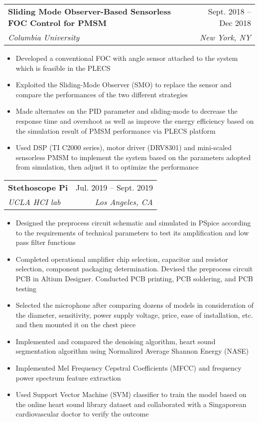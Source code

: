 \documentclass[letterpaper,11pt]{article}
\makeatletter
\newcommand{\resumeItem}[1]{
  \item\small{
    {#1 \vspace{-2pt}}
  }
}
\newcommand{\resumeSubheading}[4]{
  \vspace{-2pt}\item
    \begin{tabular*}{0.97\textwidth}[t]{l@{\extracolsep{\fill}}r}
      \textbf{#1} & #2 \\
      \textit{\small#3} & \textit{\small #4} \\
    \end{tabular*}\vspace{-7pt}
}
\newcommand{\resumeItemListStart}{\begin{itemize}}
\newcommand{\resumeItemListEnd}{\end{itemize}\vspace{-5pt}}
\makeatother
\begin{document}
    \resumeSubheading
      {Sliding Mode Observer-Based Sensorless FOC Control for PMSM}{Sept. 2018 -- Dec 2018}
      {Columbia University}{New York, NY}
      \resumeItemListStart
        \resumeItem{Developed a conventional FOC with angle sensor attached to the system which is feasible in the PLECS}
        \resumeItem{Exploited the Sliding-Mode Observer (SMO) to replace the sensor and compare the performances of the two different strategies}
        \resumeItem{Made alternates on the PID parameter and sliding-mode to decrease the response time and overshoot as well as improve the energy efficiency based on the simulation result of PMSM performance via PLECS platform}
        \resumeItem{Used DSP (TI C2000 series), motor driver (DRV8301) and mini-scaled sensorless PMSM to implement the system based on the parameters adopted from simulation, then adjust it to optimize the performance}
      \resumeItemListEnd
      
    \resumeSubheading
      {Stethoscope Pi}{Jul. 2019 -- Sept. 2019}
      {UCLA HCI lab}{Los Angeles, CA}
      \resumeItemListStart
        \resumeItem{Designed the preprocess circuit schematic and simulated in PSpice according to the requirements of technical parameters to test its amplification and low pass filter functions}
        \resumeItem{Completed operational amplifier chip selection, capacitor and resistor selection, component packaging determination. Devised the preprocess circuit PCB in Altium Designer. Conducted PCB printing, PCB soldering, and PCB testing}
        \resumeItem{Selected the microphone after comparing dozens of models in consideration of the diameter, sensitivity, power supply voltage, price, ease of installation, etc. and then mounted it on the chest piece}
        \resumeItem{Implemented and compared the denoising algorithm, heart sound segmentation algorithm using Normalized Average Shannon Energy (NASE)}
        \resumeItem{Implemented Mel Frequency Cepstral Coefficients (MFCC) and frequency power spectrum feature extraction}
        \resumeItem{Used Support Vector Machine (SVM) classifier to train the model based on the online heart sound library dataset and collaborated with a Singaporean cardiovascular doctor to verify the outcome}
    \resumeItemListEnd
\end{document}

